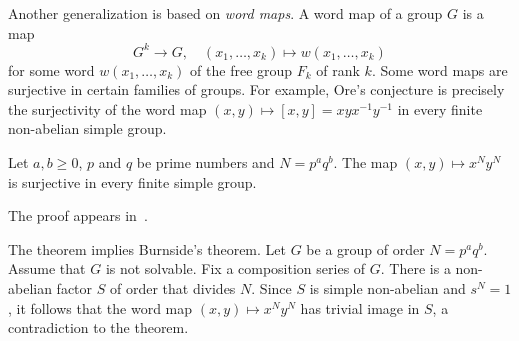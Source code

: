 Another generalization is based on \emph{word maps}. A word map
of a group $G$ is a map 
\[
G^k\to G,\quad 
(x_1,\dots,x_k)\mapsto w(x_1,\dots,x_k)
\]
for some word $w(x_1,\dots,x_k)$ of the free group $F_k$ of rank $k$. 
Some word maps are surjective in certain families of groups. For example, 
Ore's conjecture is precisely the surjectivity of the word map
$(x,y)\mapsto [x,y]=xyx^{-1}y^{-1}$ in every finite non-abelian simple 
group. 

\begin{theorem}
    Let $a,b\geq0$, $p$ and $q$ be prime numbers and $N=p^aq^b$. The map 
    $(x,y)\mapsto x^Ny^N$ is surjective in every finite simple group. 
\end{theorem}

The proof appears in~\cite{MR3827208}. 

The theorem implies Burnside's theorem. Let $G$ be a group of order
$N=p^aq^b$. Assume that $G$ is not solvable. 
Fix a composition series of $G$. There is a non-abelian factor $S$ 
of order that divides $N$. Since 
$S$ is simple non-abelian and $s^N=1$, it follows that the word map
$(x,y)\mapsto x^Ny^N$ has trivial image in $S$, a contradiction 
to the theorem. 
